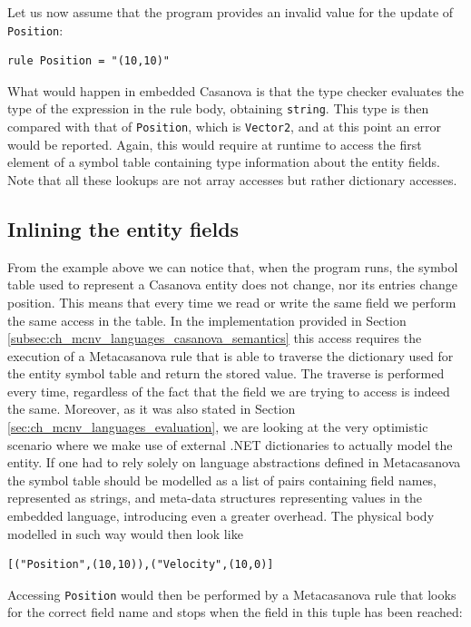 Let us now assume that the program provides an invalid value for the update of \texttt{Position}:

\begin{lstlisting}
rule Position = "(10,10)"
\end{lstlisting}

\noindent
What would happen in embedded Casanova is that the type checker evaluates the type of the expression in the rule body, obtaining \texttt{string}. This type is then compared with that of \texttt{Position}, which is \texttt{Vector2}, and at this point an error would be reported. Again, this would require at runtime to access the first element of a symbol table containing type information about the entity fields. Note that all these lookups are not array accesses but rather dictionary accesses.

\subsection{Inlining the entity fields}
\label{subsec:ch_functors_inlining}
From the example above we can notice that, when the program runs, the symbol table used to represent a Casanova entity does not change, nor its entries change position. This means that every time we read or write the same field we perform the same access in the table. In the implementation provided in Section \ref{subsec:ch_mcnv_languages_casanova_semantics} this access requires the execution of a Metacasanova rule that is able to traverse the dictionary used for the entity symbol table and return the stored value. The traverse is performed every time, regardless of the fact that the field we are trying to access is indeed the same. Moreover, as it was also stated in Section \ref{sec:ch_mcnv_languages_evaluation}, we are looking at the very optimistic scenario where we make use of external .NET dictionaries to actually model the entity. If one had to rely solely on language abstractions defined in Metacasanova the symbol table should be modelled as a list of pairs containing field names, represented as strings, and meta-data structures representing values in the embedded language, introducing even a greater overhead. The physical body modelled in such way would then look like

\begin{lstlisting}
[("Position",(10,10)),("Velocity",(10,0)]
\end{lstlisting}

Accessing \texttt{Position} would then be performed by a Metacasanova rule that looks for the correct field name and stops when the field in this tuple has been reached:

